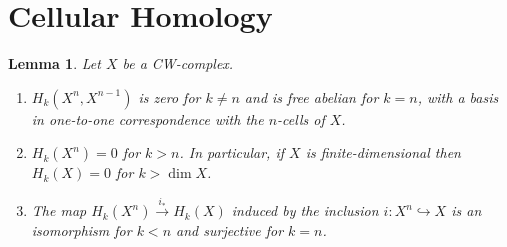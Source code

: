 \documentclass[10pt]{article}
\theoremstyle{thmstyle}
\newtheorem{lemma}[theorem]{Lemma}
\theoremstyle{defstyle}
\newcommand{\into}{\hookrightarrow}
\begin{document}
\section{Cellular Homology}

\begin{lemma}
    Let $X$ be a CW-complex.
    \begin{enumerate}[label=(\alph*)]
        \item $H_k(X^n, X^{n - 1})$ is zero for $k\ne n$ and is free abelian for $k = n$, with a basis in one-to-one correspondence with the $n$-cells of $X$.
        \item $H_k(X^n) = 0$ for $k > n$. In particular, if $X$ is finite-dimensional then $H_k(X) = 0$ for $k > \dim X$.
        \item The map $H_k(X^n)\xrightarrow{i_\ast} H_k(X)$ induced by the inclusion $i: X^n\into X$ is an isomorphism for $k < n$ and surjective for $k = n$.
    \end{enumerate}
\end{lemma}
\end{document}
